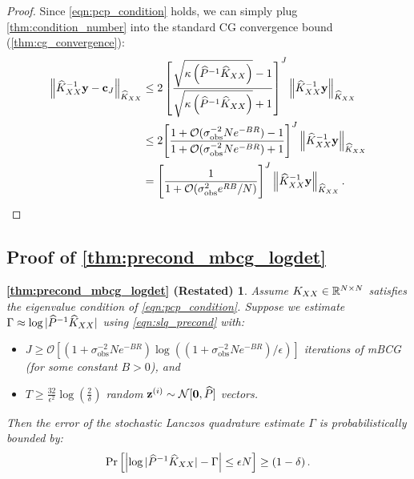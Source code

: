 \begin{proof}
Since \cref{eqn:pcp_condition} holds, we can simply plug \cref{thm:condition_number} into the standard CG convergence bound (\cref{thm:cg_convergence}):
%
\begin{align*}
  \left \Vert \trainK^{-1} \by - \bc_{J} \right \Vert_{\trainK}
  &\leq
  2 \left[ \frac{ \sqrt{ \kappa\left( \trainP^{-1} \trainK \right)}  - 1 }{\sqrt{ \kappa \left( \trainP^{-1} \trainK \right)} + 1} \right]^J
  \left \Vert \trainK^{-1} \by \right \Vert_{\trainK}
  \\
  &\leq
  2 \Bigg[ \frac{ 1 + \bigo{ \sigma^{-2}_\text{obs} N e^{-BR} } - 1 }{ 1 + \bigo{ \sigma^{-2}_\text{obs} N e^{-BR} } + 1} \Bigg]^J
  \left \Vert \trainK^{-1} \by \right \Vert_{\trainK}
  \\
  &=
  \Bigg[ \frac 1 {1 + \bigo{\sigma^{2}_\text{obs} e^{RB}/N}} \Bigg]^{J}
  \left \Vert \trainK^{-1} \by \right \Vert_{\trainK}.
\end{align*}
\end{proof}




\subsection{Proof of \cref{thm:precond_mbcg_logdet}}
\newtheorem*{thm:precond_mbcg_logdet}{\cref{thm:precond_mbcg_logdet} (Restated)}
\begin{thm:precond_mbcg_logdet}
  Assume $K_{XX} \in \mathbb{R}^{N \times N}$ satisfies the eigenvalue condition of \cref{eqn:pcp_condition}.
	Suppose we estimate $\Gamma \approx \log \vert \widehat{P}^{-1} \widehat{K}_{XX} \vert$ using \cref{eqn:slq_precond} with:
	\begin{itemize}
		\item $J \geq \mathcal{O} \left[ (1 + \sigma^{-2}_\text{obs} N e^{-BR}) \log \left( ( 1 + \sigma^{-2}_\text{obs} N e^{-BR} ) / \epsilon \right) \right]$ iterations of mBCG (for some constant $B > 0$), and
		\item $T \geq \frac{32}{\epsilon^2} \log \left( \frac 2 \delta \right)$ random $\bz^{(i)} \sim \normaldist{\bzero}{\trainP}$ vectors.
	\end{itemize}
  Then the error of the stochastic Lanczos quadrature estimate $\Gamma$ is probabilistically bounded by:
  \begin{equation*}
    \textrm{Pr}\left[\Bigl\vert \log \vert \widehat{P}^{-1} \widehat{K}_{XX} \vert - \Gamma \Bigr\vert \leq \epsilon N \right] \geq \left( 1 - \delta \right).
  \end{equation*}
\end{thm:precond_mbcg_logdet}

